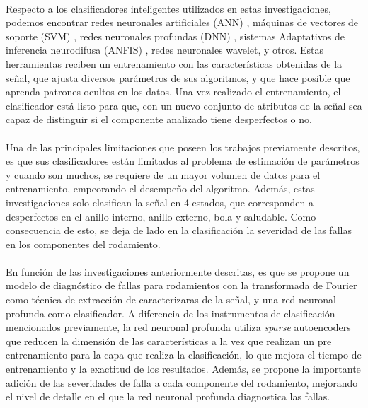 \documentclass[12pt]{article}%
\begin{document}
\paragraph{}
Respecto a los clasificadores inteligentes utilizados en estas investigaciones, podemos encontrar redes neuronales artificiales (ANN) \cite{ali}, máquinas de vectores de soporte (SVM) \cite{konar}, redes neuronales profundas (DNN) \cite{ran}, sistemas Adaptativos de inferencia neurodifusa (ANFIS) \cite{issam}, redes neuronales wavelet,  y otros. Estas herramientas reciben un entrenamiento con las características obtenidas de la señal, que ajusta diversos parámetros de sus algoritmos, y que hace posible que aprenda patrones ocultos en los datos. Una vez realizado el entrenamiento, el clasificador está listo para que, con un nuevo conjunto de atributos de la señal sea capaz de distinguir si el componente analizado tiene desperfectos o no.

\paragraph{}
Una de las principales limitaciones que poseen los trabajos previamente descritos, es que sus clasificadores están limitados al problema de estimación de parámetros y cuando son muchos, se requiere de un mayor volumen de datos para el entrenamiento, empeorando el desempeño del algoritmo. Además, estas investigaciones solo clasifican la señal en 4 estados, que corresponden a desperfectos en el anillo interno, anillo externo, bola y saludable. Como consecuencia de esto, se deja de lado en la clasificación la severidad de las fallas en los componentes del rodamiento.

\paragraph{}
En función de las investigaciones anteriormente descritas, es que se propone un modelo de diagnóstico de fallas para rodamientos con la transformada de Fourier como técnica de extracción de caracterizaras de la señal, y una red neuronal profunda como clasificador. A diferencia de los instrumentos de clasificación mencionados previamente, la red neuronal profunda utiliza \textit{sparse} autoencoders que reducen la dimensión de las características a la vez que realizan un pre entrenamiento para la capa que realiza la clasificación, lo que mejora el tiempo de entrenamiento y la exactitud de los resultados. Además, se propone la importante adición de las severidades de falla a cada componente del rodamiento, mejorando el nivel de detalle en el que la red neuronal profunda diagnostica las fallas.
\end{document}
